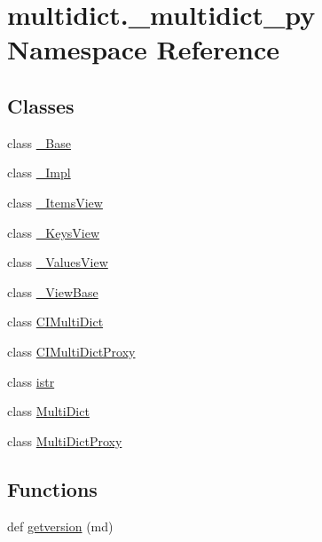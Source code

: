 \hypertarget{namespacemultidict_1_1__multidict__py}{}\section{multidict.\+\_\+multidict\+\_\+py Namespace Reference}
\label{namespacemultidict_1_1__multidict__py}
\subsection*{Classes}
\begin{DoxyCompactItemize}
\item 
class \hyperlink{classmultidict_1_1__multidict__py_1_1___base}{\+\_\+\+Base}
\item 
class \hyperlink{classmultidict_1_1__multidict__py_1_1___impl}{\+\_\+\+Impl}
\item 
class \hyperlink{classmultidict_1_1__multidict__py_1_1___items_view}{\+\_\+\+Items\+View}
\item 
class \hyperlink{classmultidict_1_1__multidict__py_1_1___keys_view}{\+\_\+\+Keys\+View}
\item 
class \hyperlink{classmultidict_1_1__multidict__py_1_1___values_view}{\+\_\+\+Values\+View}
\item 
class \hyperlink{classmultidict_1_1__multidict__py_1_1___view_base}{\+\_\+\+View\+Base}
\item 
class \hyperlink{classmultidict_1_1__multidict__py_1_1_c_i_multi_dict}{C\+I\+Multi\+Dict}
\item 
class \hyperlink{classmultidict_1_1__multidict__py_1_1_c_i_multi_dict_proxy}{C\+I\+Multi\+Dict\+Proxy}
\item 
class \hyperlink{classmultidict_1_1__multidict__py_1_1istr}{istr}
\item 
class \hyperlink{classmultidict_1_1__multidict__py_1_1_multi_dict}{Multi\+Dict}
\item 
class \hyperlink{classmultidict_1_1__multidict__py_1_1_multi_dict_proxy}{Multi\+Dict\+Proxy}
\end{DoxyCompactItemize}
\subsection*{Functions}
\begin{DoxyCompactItemize}
\item 
def \hyperlink{namespacemultidict_1_1__multidict__py_a847acfaabf12fc813ab3ca7943043227}{getversion} (md)
\end{DoxyCompactItemize}
